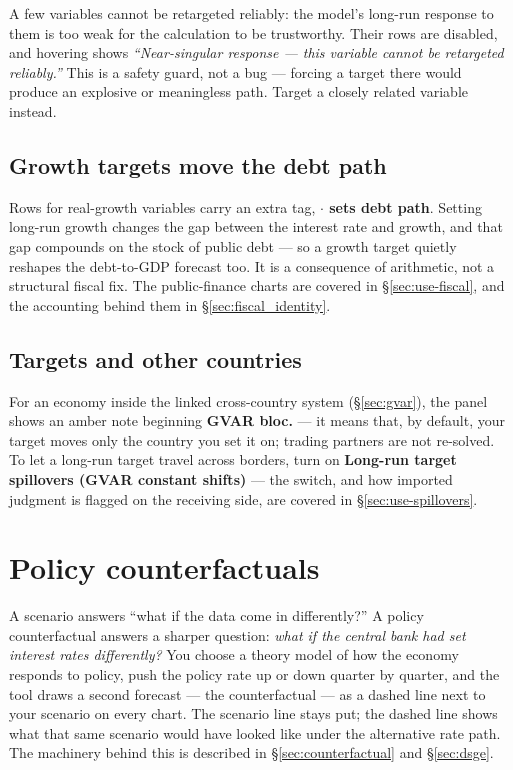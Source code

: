 \documentclass[11pt]{article}
\theoremstyle{definition}
\theoremstyle{remark}
\begin{document}
A few variables cannot be retargeted reliably: the model's long-run response to them is
too weak for the calculation to be trustworthy. Their rows are disabled, and hovering
shows \emph{``Near-singular response --- this variable cannot be retargeted
reliably.''} This is a safety guard, not a bug --- forcing a target there would produce
an explosive or meaningless path. Target a closely related variable instead.

\subsection{Growth targets move the debt path}

Rows for real-growth variables carry an extra tag, \textbf{\(\cdot\) sets debt path}.
Setting long-run growth changes the gap between the interest rate and growth, and that
gap compounds on the stock of public debt --- so a growth target quietly reshapes the
debt-to-GDP forecast too. It is a consequence of arithmetic, not a structural fiscal
fix. The public-finance charts are covered in \S\ref{sec:use-fiscal}, and the
accounting behind them in \S\ref{sec:fiscal_identity}.

\subsection{Targets and other countries}

For an economy inside the linked cross-country system (\S\ref{sec:gvar}), the panel
shows an amber note beginning \textbf{GVAR bloc.} --- it means that, by default, your
target moves only the country you set it on; trading partners are not re-solved. To
let a long-run target travel across borders, turn on \textbf{Long-run target
spillovers (GVAR constant shifts)} --- the switch, and how imported judgment is
flagged on the receiving side, are covered in \S\ref{sec:use-spillovers}.

\section{Policy counterfactuals}\label{sec:use-counterfactual}

A scenario answers ``what if the data come in differently?'' A policy
counterfactual answers a sharper question: \emph{what if the central bank had
set interest rates differently?} You choose a theory model of how the economy
responds to policy, push the policy rate up or down quarter by quarter, and the
tool draws a second forecast --- the counterfactual --- as a dashed line next
to your scenario on every chart. The scenario line stays put; the dashed line
shows what that same scenario would have looked like under the alternative
rate path. The machinery behind this is described in \S\ref{sec:counterfactual}
and \S\ref{sec:dsge}.
\end{document}
